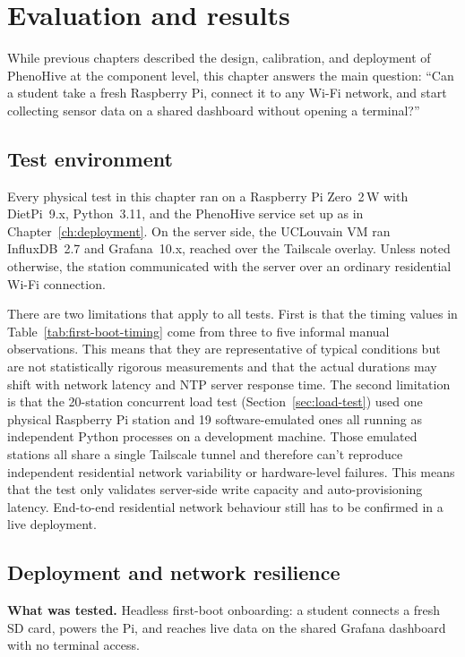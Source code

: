 \chapter{Evaluation and results}
\label{ch:evaluation}

While previous chapters described the design, calibration, and deployment of PhenoHive at the component level, this chapter answers the main question: ``Can a student take a fresh Raspberry Pi, connect it to any Wi-Fi network, and start collecting sensor data on a shared dashboard without opening a terminal?''

\section{Test environment}
\label{sec:test-environment}

Every physical test in this chapter ran on a Raspberry Pi Zero~2\,W with DietPi~9.x, Python~3.11, and the PhenoHive service set up as in Chapter~\ref{ch:deployment}. On the server side, the UCLouvain VM ran InfluxDB~2.7 and Grafana~10.x, reached over the Tailscale overlay. Unless noted otherwise, the station communicated with the server over an ordinary residential Wi-Fi connection.

There are two limitations that apply to all tests. First is that the timing values in Table~\ref{tab:first-boot-timing} come from three to five informal manual observations. This means that they are representative of typical conditions but are not statistically rigorous measurements and that the actual durations may shift with network latency and NTP server response time. The second limitation is that the 20-station concurrent load test (Section~\ref{sec:load-test}) used one physical Raspberry Pi station and 19 software-emulated ones all running as independent Python processes on a development machine. Those emulated stations all share a single Tailscale tunnel and therefore can't reproduce independent residential network variability or hardware-level failures. This means that the test only validates server-side write capacity and auto-provisioning latency. End-to-end residential network behaviour still has to be confirmed in a live deployment.

\section{Deployment and network resilience}
\label{sec:deployment-eval}

\textbf{What was tested.} Headless first-boot onboarding: a student connects a fresh SD card, powers the Pi, and reaches live data on the shared Grafana dashboard with no terminal access.


